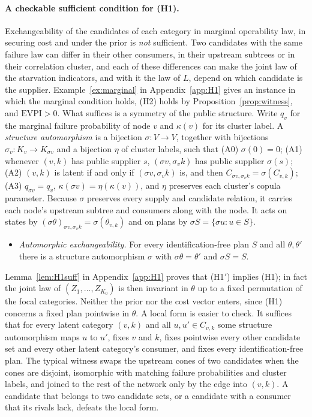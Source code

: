 \documentclass[pdflatex,sn-mathphys-num]{sn-jnl}
\theoremstyle{thmstyleone}
\theoremstyle{thmstyletwo}
\theoremstyle{thmstylethree}
\newcommand{\evpi}{\mathrm{EVPI}}
\begin{document}
\paragraph{A checkable sufficient condition for (H1).} Exchangeability of the
candidates of each category in marginal operability law, in securing cost and
under the prior is \emph{not} sufficient. Two candidates with the same failure
law can differ in their other consumers, in their upstream subtrees or in their
correlation cluster, and each of these differences can make the joint law of
the starvation indicators, and with it the law of $L$, depend on which
candidate is the supplier. Example~\ref{ex:marginal} in
Appendix~\ref{app:H1} gives an instance in which the marginal condition holds,
(H2) holds by Proposition~\ref{prop:witness}, and $\evpi>0$. What suffices is
a symmetry of the public structure. Write $q_v$ for the marginal failure
probability of node $v$ and $\kappa(v)$ for its cluster label. A
\emph{structure automorphism} is a bijection $\sigma:V\to V$, together with
bijections $\sigma_v:K_v\to K_{\sigma v}$ and a bijection $\eta$ of cluster
labels, such that
(A0) $\sigma(0)=0$;
(A1) whenever $(v,k)$ has public supplier $s$, $(\sigma v,\sigma_vk)$ has
public supplier $\sigma(s)$;
(A2) $(v,k)$ is latent if and only if $(\sigma v,\sigma_vk)$ is, and then
$C_{\sigma v,\sigma_vk}=\sigma(C_{v,k})$;
(A3) $q_{\sigma v}=q_v$, $\kappa(\sigma v)=\eta(\kappa(v))$, and $\eta$
preserves each cluster's copula parameter.
Because $\sigma$ preserves every supply and candidate relation, it carries
each node's upstream subtree and consumers along with the node. It acts on
states by $(\sigma\theta)_{\sigma v,\sigma_vk}=\sigma(\theta_{v,k})$ and on
plans by $\sigma S=\{\sigma u:u\in S\}$.
\begin{itemize}
\item[(H1$'$)] \emph{Automorphic exchangeability.} For every
identification-free plan $S$ and all $\theta,\theta'$ there is a structure
automorphism $\sigma$ with $\sigma\theta=\theta'$ and $\sigma S=S$.
\end{itemize}
Lemma~\ref{lem:H1suff} in Appendix~\ref{app:H1} proves that (H1$'$) implies
(H1); in fact the joint law of $(Z_1,\dots,Z_{K_0})$ is then invariant in
$\theta$ up to a fixed permutation of the focal categories. Neither the prior
nor the cost vector enters, since (H1) concerns a fixed plan pointwise in
$\theta$. A local form is easier to check. It suffices that for every latent
category $(v,k)$ and all $u,u'\in C_{v,k}$ some structure automorphism maps
$u$ to $u'$, fixes $v$ and $k$, fixes pointwise every other candidate set and
every other latent category's consumer, and fixes every identification-free
plan. The typical witness swaps the upstream cones of two candidates when the
cones are disjoint, isomorphic with matching failure probabilities and cluster
labels, and joined to the rest of the network only by the edge into $(v,k)$.
A candidate that belongs to two candidate sets, or a candidate with a
consumer that its rivals lack, defeats the local form.
\end{document}
